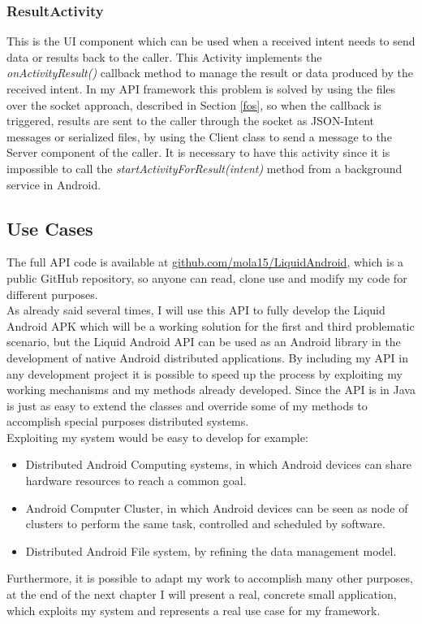 \subsubsection{ResultActivity}
This is the UI component which can be used when a received intent needs to send data or results back to the caller. This Activity implements the \textit{onActivityResult()} callback method to manage the result or data produced by the received intent. In my API framework this problem is solved by using the files over the socket approach, described in Section \ref{fos}, so when the callback is triggered, results are sent to the caller through the socket as JSON-Intent messages or serialized files, by using the Client class to send a message to the Server component of the caller. It is necessary to have this activity since it is impossible to call the \textit{startActivityForResult(intent)} method from a background service in Android.

\subsection{Use Cases}
The full API code is available at \href{https://github.com/mola15/LiquidAndroid}{github.com/mola15/LiquidAndroid}, which is a public GitHub repository, so anyone can read, clone use and modify my code for different purposes.\\
As already said several times, I will use this API to fully develop the Liquid Android APK which will be a working solution for the first and third problematic scenario, but the Liquid Android API can be used as an Android library in the development of native Android distributed applications. By including my API in any development project it is possible to speed up the process by exploiting my working mechanisms and my methods already developed. Since the API is in Java is just as easy to extend the classes and override some of my methods to accomplish special purposes distributed systems.\\
Exploiting my system would be easy to develop for example:
\begin{itemize}
	\item Distributed Android Computing systems, in which Android devices can share hardware resources to reach a common goal.
	\item Android Computer Cluster, in which Android devices can be seen as node of clusters to perform the same task, controlled and scheduled by software.
	\item Distributed Android File system, by refining the data management model.
\end{itemize}
Furthermore, it is possible to adapt my work to accomplish many other purposes, at the end of the next chapter I will present a real, concrete small application, which exploits my system and represents a real use case for my framework.

%
